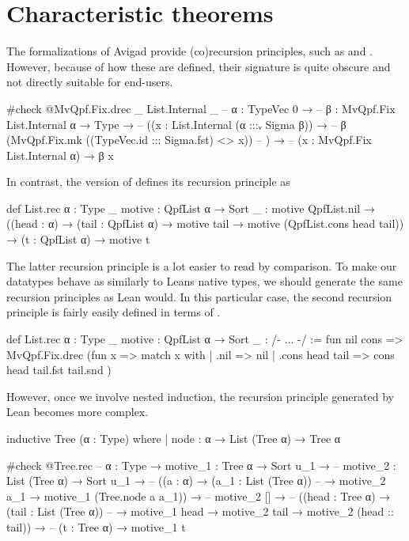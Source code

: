 \section{Characteristic theorems}

The formalizations of Avigad \etal{} provide (co)recursion principles, such as  and .
However, because of how these are defined, their signature is quite obscure and not directly suitable for end-users.
\begin{leancode}
  #check @MvQpf.Fix.drec _ List.Internal _
  -- {α : TypeVec 0} →
  --   {β : MvQpf.Fix List.Internal α → Type} →
  --     ((x : List.Internal (α :::ᵥ Sigma β)) → 
  --        β (MvQpf.Fix.mk ((TypeVec.id ::: Sigma.fst) <$$> x))
  --     ) →
  --       (x : MvQpf.Fix List.Internal α) → β x
\end{leancode}

In contrast, the \inductive{} version of  defines its recursion principle as
\begin{leancode}
  def List.rec {α : Type _} {motive : QpfList α → Sort _} :
  motive QpfList.nil 
    → ((head : α) → (tail : QpfList α) → motive tail 
                                          → motive (QpfList.cons head tail))
    → (t : QpfList α) 
    → motive t
\end{leancode}

The latter recursion principle is a lot easier to read by comparison. To make our datatypes behave as similarly to Leans native
\inductive{} types, we should generate the same recursion principles as Lean would.
In this particular case, the second recursion principle is fairly easily defined in terms of .
\begin{leancode}
  def List.rec {α : Type _} {motive : QpfList α → Sort _} : /- ... -/ :=
    fun nil cons => MvQpf.Fix.drec (fun x => 
      match x with
      | .nil            => nil
      | .cons head tail => cons head tail.fst tail.snd
    )
\end{leancode}

However, once we involve nested induction, the recursion principle generated by Lean becomes more complex.

\begin{leancode}
  inductive Tree (α : Type) where
  | node : α → List (Tree α) → Tree α

  #check @Tree.rec
  -- {α : Type} → {motive_1 : Tree α → Sort u_1} →
  --   {motive_2 : List (Tree α) → Sort u_1} →
  --   ((a : α) → (a_1 : List (Tree α)) 
  --        → motive_2 a_1 → motive_1 (Tree.node a a_1)) →
  --   motive_2 [] →
  --   ((head : Tree α) → (tail : List (Tree α)) 
  --        → motive_1 head → motive_2 tail → motive_2 (head :: tail)) →
  --   (t : Tree α) → motive_1 t
\end{leancode}


